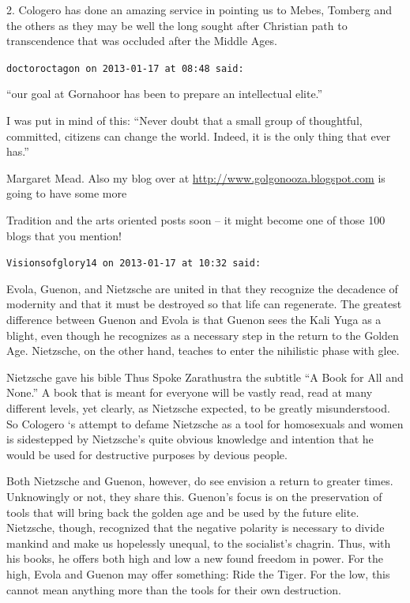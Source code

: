 \begin{footnotesize}
\begin{sffamily}
2. Cologero has done an amazing service in pointing us to Mebes, Tomberg and the others as they may be well the long sought after Christian path to transcendence that was occluded after the Middle Ages.

\hfill

\texttt{doctoroctagon on 2013-01-17 at 08:48 said:}

``our goal at Gornahoor has been to prepare an intellectual elite.''

I was put in mind of this: ``Never doubt that a small group of thoughtful, committed, citizens can change the world. Indeed, it is the only thing that ever has.''

Margaret Mead. Also my blog over at \url{http://www.golgonooza.blogspot.com} is going to have some more

Tradition and the arts oriented posts soon -- it might become one of those 100 blogs that you mention!

\hfill

\texttt{Visionsofglory14 on 2013-01-17 at 10:32 said:}

Evola, Guenon, and Nietzsche are united in that they recognize the decadence of modernity and that it must be destroyed so that life can regenerate. The greatest difference between Guenon and Evola is that Guenon sees the Kali Yuga as a blight, even though he recognizes as a necessary step in the return to the Golden Age. Nietzsche, on the other hand, teaches to enter the nihilistic phase with glee.

Nietzsche gave his bible Thus Spoke Zarathustra the subtitle ``A Book for All and None.'' A book that is meant for everyone will be vastly read, read at many different levels, yet clearly, as Nietzsche expected, to be greatly misunderstood. So Cologero `s attempt to defame Nietzsche as a tool for homosexuals and women is sidestepped by Nietzsche's quite obvious knowledge and intention that he would be used for destructive purposes by devious people.

Both Nietzsche and Guenon, however, do see envision a return to greater times. Unknowingly or not, they share this. Guenon's focus is on the preservation of tools that will bring back the golden age and be used by the future elite. Nietzsche, though, recognized that the negative polarity is necessary to divide mankind and make us hopelessly unequal, to the socialist's chagrin. Thus, with his books, he offers both high and low a new found freedom in power. For the high, Evola and Guenon may offer something: Ride the Tiger. For the low, this cannot mean anything more than the tools for their own destruction.


\end{sffamily}
\end{footnotesize}

